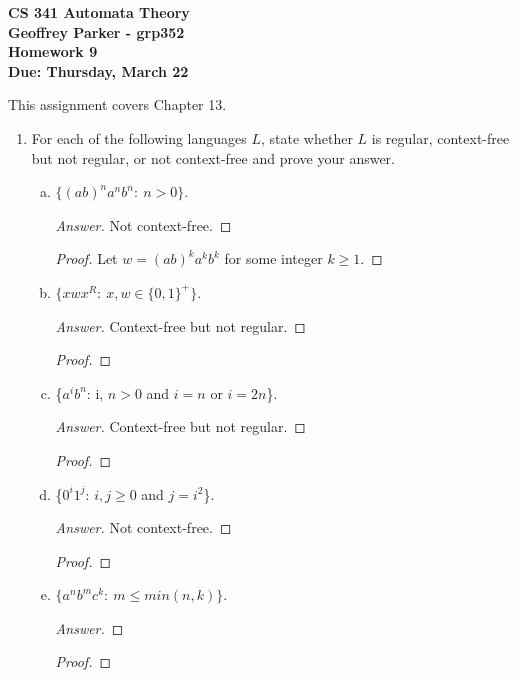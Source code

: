 \documentclass[10pt]{article}
\begin{document}
\begin{flushleft}
\textbf{\noindent
CS 341 Automata Theory \\
Geoffrey Parker - grp352 \\
Homework 9 \\
Due: Thursday, March 22}\\
\end{flushleft}
\noindent
This assignment covers Chapter 13. \\

\begin{enumerate}[1)]


\item
For each of the following languages $L$, state whether $L$ is regular, context-free but not regular, or not context-free and prove your answer.
\begin{enumerate}[a)]
\item
$\{(ab)^na^nb^n:\ n > 0\}$.
\begin{proof}[Answer]
Not context-free.
\end{proof}
\begin{proof}[Proof]
Let $w = (ab)^ka^kb^k$ for some integer $k \geq 1$.  
\end{proof}

\item
$\{xwx^R:\ x, w \in \{0, 1\}^+\}$.
\begin{proof}[Answer]
Context-free but not regular.
\end{proof}
\begin{proof}[Proof]
\end{proof}

\item
\{$a^ib^n$: i, $n > 0$ and $i = n$ or $i = 2n$\}.
\begin{proof}[Answer]
Context-free but not regular.
\end{proof}
\begin{proof}[Proof]
\end{proof}

\item
\{$0^i1^j$: $i, j \geq 0$ and $j = i^2$\}.
\begin{proof}[Answer]
Not context-free.
\end{proof}
\begin{proof}[Proof]
\end{proof}

\item
$\{a^nb^mc^k:\ m \leq min(n, k)\}$.
\begin{proof}[Answer]
\end{proof}
\begin{proof}[Proof]
\end{proof}


\end{enumerate}
\end{enumerate}
\end{document}
